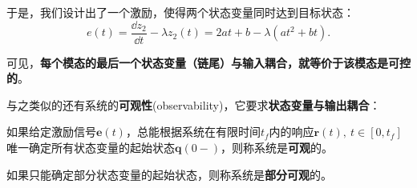 \begin{example}
    于是，我们设计出了一个激励，使得两个状态变量同时达到目标状态：
    \begin{equation}
        e(t)=\frac{\dd z_2}{\dd t}-\lambda z_2(t)=2at+b-\lambda (at^2+bt).
    \end{equation}
\end{example}

可见，\textbf{每个模态的最后一个状态变量（链尾）与输入耦合，就等价于该模态是可控的}。

与之类似的还有系统的\textbf{可观性}(observability)，它要求\textbf{状态变量与输出耦合}：

\begin{definition}[可观性]
    如果给定激励信号$\mathbf{e}(t)$，总能根据系统在有限时间$t_f$内的响应$\mathbf{r}(t),\ t\in[0,t_f]$唯一确定所有状态变量的起始状态$\mathbf{q}(0-)$，则称系统是\textbf{可观}的。

    如果只能确定部分状态变量的起始状态，则称系统是\textbf{部分可观}的。
\end{definition}


